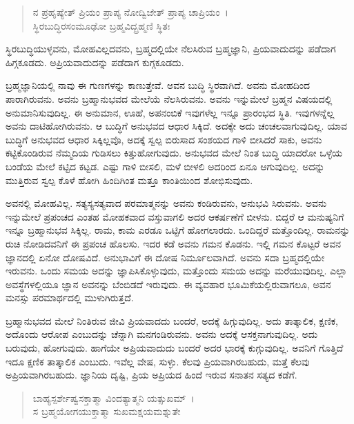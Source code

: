 \begin{verse}
ನ ಪ್ರಹೃಷ್ಯೇತ್ ಪ್ರಿಯಂ ಪ್ರಾಪ್ಯ ನೋದ್ವಿಜೇತ್ ಪ್ರಾಪ್ಯ ಚಾಪ್ರಿಯಂ~।\\ಸ್ಥಿರಬುದ್ಧಿರಸಂಮೂಢೋ ಬ್ರಹ್ಮವಿದ್ಬ್ರಹ್ಮಣಿ ಸ್ಥಿತಃ 
\end{verse}

{\small ಸ್ಥಿರಬುದ್ಧಿಯುಳ್ಳವನು, ಮೋಹವಿಲ್ಲದವನು, ಬ್ರಹ್ಮದಲ್ಲಿಯೇ ನೆಲಸಿರುವ ಬ್ರಹ್ಮಜ್ಞಾನಿ, ಪ್ರಿಯವಾದುದನ್ನು ಪಡೆದಾಗ ಹಿಗ್ಗಕೂಡದು. ಅಪ್ರಿಯವಾದುದನ್ನು ಪಡೆದಾಗ ಕುಗ್ಗಕೂಡದು.}

ಬ್ರಹ್ಮಜ್ಞಾನಿಯಲ್ಲಿ ನಾವು ಈ ಗುಣಗಳನ್ನು ಕಾಣುತ್ತೇವೆ. ಅವನ ಬುದ್ಧಿ ಸ್ಥಿರವಾಗಿದೆ. ಅವನು ಮೋಹದಿಂದ ಪಾರಾಗಿರುವನು. ಅವನು ಬ್ರಹ್ಮಾನುಭವದ ಮೇಲೆಯೆ ನೆಲಸಿರುವನು. ಅವನು ಇನ್ನುಮೇಲೆ ಬ್ರಹ್ಮನ ವಿಷಯದಲ್ಲಿ ಅನುಮಾನಿಸುವುದಿಲ್ಲ. ಈ ಅನುಮಾನ, ಊಹೆ, ಅಪನಂಬಿಕೆ ಇವುಗಳೆಲ್ಲ ಇನ್ನೂ ಪ್ರಾರಂಭದ ಸ್ಥಿತಿ. ಇವುಗಳನ್ನೆಲ್ಲ ಅವನು ದಾಟಿಹೋಗಿರುವನು. ಆ ಬುದ್ಧಿಗೆ ಅನುಭವದ ಆಧಾರ ಸಿಕ್ಕಿದೆ. ಅದಕ್ಕೇ ಅದು ಚಂಚಲವಾಗುವುದಿಲ್ಲ. ಯಾವ ಬುದ್ಧಿಗೆ ಅನುಭವದ ಆಧಾರ ಸಿಕ್ಕಿಲ್ಲವೊ, ಅದಕ್ಕೆ ಸ್ವಲ್ಪ ಬಿರುಸಾದ ಸಂಶಯದ ಗಾಳಿ ಬೀಸಿದರೆ ಸಾಕು, ಅವನು ಕಟ್ಟಿಕೊಂಡಿರುವ ನೆಮ್ಮದಿಯ ಗುಡಿಸಲು ಕಿತ್ತುಹೋಗುವುದು. ಅನುಭವದ ಮೇಲೆ ನಿಂತ ಬುದ್ಧಿ ಯಾದರೋ ಒಳ್ಳೆಯ ಬಂಡೆಯ ಮೇಲೆ ಕಟ್ಟಿದ ಕಟ್ಟಡ. ಎಷ್ಟು ಗಾಳಿ ಬೀಸಲಿ, ಮಳೆ ಬೀಳಲಿ ಅದರಿಂದ ಏನೂ ಆಗುವುದಿಲ್ಲ. ಅದನ್ನು ಮುತ್ತಿರುವ ಸ್ವಲ್ಪ ಕೊಳೆ ಹೋಗಿ ಹಿಂದಿಗಿಂತ ಮತ್ತೂ ಕಾಂತಿಯಿಂದ ಶೋಭಿಸುವುದು.

ಅವನಲ್ಲಿ ಮೋಹವಿಲ್ಲ. ಸತ್ಯಸ್ಯಸತ್ಯವಾದ ಪರಮಾತ್ಮನನ್ನು ಅವನು ಕಂಡಿರುವನು, ಅನುಭವಿ ಸಿರುವನು. ಅವನು ಇನ್ನುಮೇಲೆ ಪ್ರಪಂಚದ ಎಂತಹ ಮೋಹಕವಾದ ವಸ್ತುವಾಗಲಿ ಅದರ ಆಕರ್ಷಣೆಗೆ ಬೀಳನು. ಬಿದ್ದರೆ ಆ ಮನುಷ್ಯನಿಗೆ ಇನ್ನೂ ಬ್ರಹ್ಮಾನುಭವ ಸಿಕ್ಕಿಲ್ಲ. ರಾಮ, ಕಾಮ ಎರಡೂ ಒಟ್ಟಿಗೆ ಹೋಗಲಾರದು. ಒಂದಿದ್ದರೆ ಮತ್ತೊಂದಿಲ್ಲ. ರಾಮನನ್ನು ರುಚಿ ನೋಡಿದವನಿಗೆ ಈ ಪ್ರಪಂಚ ಹೊಲಸು. ಇದರ ಕಡೆ ಅವನು ಗಮನ ಕೊಡನು. ಇಲ್ಲಿ ಗಮನ ಕೊಟ್ಟರೆ ಅವನ ಜ್ಞಾನದಲ್ಲಿ ಏನೋ ದೋಷವಿದೆ. ಅನುಭಾವಿಗೆ ಈ ದೋಷ ನಿರ್ಮೂಲವಾಗಿದೆ. ಅವನು ಸದಾ ಬ್ರಹ್ಮದಲ್ಲಿಯೇ ಇರುವನು. ಒಂದು ಸಮಯ ಅದನ್ನು ಜ್ಞಾಪಿಸಿಕೊಳ್ಳುವುದು, ಮತ್ತೊಂದು ಸಮಯ ಅದನ್ನು ಮರೆಯುವುದಿಲ್ಲ. ಎಲ್ಲಾ ಅವಸ್ಥೆಗಳಲ್ಲಿಯೂ ಜ್ಞಾನ ಅವನನ್ನು ಬೆಂಬಿಡದೆ ಇರುವುದು. ಈ ವ್ಯವಹಾರ ಭೂಮಿಕೆಯಲ್ಲಿರುವಾಗಲೂ, ಅವನ ಮನಸ್ಸು ಪರಮಾರ್ಥದಲ್ಲಿ ಮುಳುಗಿರುತ್ತದೆ.

ಬ್ರಹ್ಮಾನುಭವದ ಮೇಲೆ ನಿಂತಿರುವ ಜೀವಿ ಪ್ರಿಯವಾದದು ಬಂದರೆ, ಅದಕ್ಕೆ ಹಿಗ್ಗುವುದಿಲ್ಲ. ಅದು ತಾತ್ಕಾಲಿಕ, ಕ್ಷಣಿಕ, ಅದೊಂದು ಆರೋಪ ಎಂಬುದನ್ನು ಚೆನ್ನಾಗಿ ಮನಗಂಡಿರುವನು. ಅವನು ಅದಕ್ಕೆ ಆಸಕ್ತನಾಗುವುದಿಲ್ಲ. ಅದು ಬರುವುದು, ಹೋಗುವುದು. ಹಾಗೆಯೇ ಅಪ್ರಿಯವಾದುದು ಬಂದರೆ ಅದರ ಭಾರಕ್ಕೆ ಕುಗ್ಗುವುದಿಲ್ಲ. ಅವನಿಗೆ ಗೊತ್ತಿದೆ ಇದೂ ಕ್ಷಣಿಕ ತಾತ್ಕಾಲಿಕ ಎಂಬುದು. ಇವೆಲ್ಲ ವೇಷ, ಸುಳ್ಳು. ಕೆಲವು ಪ್ರಿಯವಾಗಿರಬಹುದು, ಮತ್ತೆ ಕೆಲವು ಅಪ್ರಿಯವಾಗಿರಬಹುದು. ಜ್ಞಾನಿಯ ದೃಷ್ಟಿ, ಪ್ರಿಯ ಅಪ್ರಿಯದ ಹಿಂದೆ ಇರುವ ಸನಾತನ ಸತ್ಯದ ಕಡೆಗೆ.

\begin{verse}
ಬಾಹ್ಯಸ್ಪರ್ಶೇಷ್ವಸಕ್ತಾತ್ಮಾ ವಿಂದತ್ಯಾತ್ಮನಿ ಯತ್ಸುಖಮ್~।\\ಸ ಬ್ರಹ್ಮಯೋಗಯುಕ್ತಾತ್ಮಾ ಸುಖಮಕ್ಷಯಮಶ್ನುತೇ 
\end{verse}

